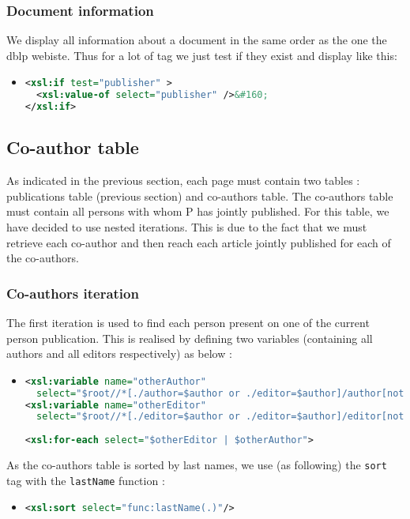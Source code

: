 \documentclass{article}
\begin{document}
    \subsubsection{Document information}
      We display all information about a document in the same order as the one the dblp webiste.  Thus for a lot of tag we just test if they exist and display like this:
      \begin{itemize}
	\item \begin{lstlisting}[language=XML]
<xsl:if test="publisher" >
  <xsl:value-of select="publisher" />&#160;
</xsl:if>\end{lstlisting}
      \end{itemize}

  \subsection{Co-author table}
    \label{sec:coauthor}
    As indicated in the previous section, each page must contain two tables : publications table (previous section) and co-authors table. The co-authors table must contain all persons with whom P has jointly published. For this table, we have decided to use nested iterations. This is due to the fact that we must retrieve each co-author and then reach each article jointly published for each of the co-authors.
  
    \subsubsection{Co-authors iteration}
      The first iteration is used to find each person present on one of the current person publication. This is realised by defining two variables (containing all authors and all editors respectively) as below :
      \begin{itemize}
	\item \begin{lstlisting}[language=XML]
<xsl:variable name="otherAuthor" 
  select="$root//*[./author=$author or ./editor=$author]/author[not(.=$author)]" />
<xsl:variable name="otherEditor" 
  select="$root//*[./editor=$author or ./editor=$author]/editor[not(.=$author)]" />
  
<xsl:for-each select="$otherEditor | $otherAuthor">\end{lstlisting}
      \end{itemize}
      As the co-authors table is sorted by last names, we use (as following) the \verb|sort| tag with the \verb|lastName| function :
      \begin{itemize}
	\item \begin{lstlisting}[language=XML]
<xsl:sort select="func:lastName(.)"/>\end{lstlisting}
      \end{itemize}
      
\end{document}
